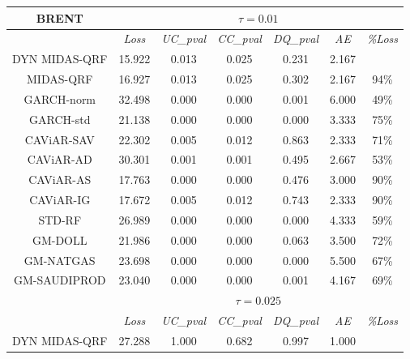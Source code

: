 \begin{table}[H]
\renewcommand{\arraystretch}{0.7}
\centering
\begin{tabular}{ccccccc}
\hline
\textbf{BRENT} & \multicolumn{6}{c}{$\tau=0.01$}                          \\ \hline
                                & \textit{Loss}   & \textit{UC\_pval} & \textit{CC\_pval} & \textit{DQ\_pval} & \textit{AE }   & \textit{\%Loss} \\ \hline
\rowcolor[HTML]{D9D9D9} 
DYN MIDAS-QRF                       & 15.922 & 0.013    & 0.025    & 0.231    & 2.167 &        \\
\rowcolor[HTML]{D9D9D9} 
MIDAS-QRF                   & 16.927 & 0.013    & 0.025    & 0.302    & 2.167 & 94\%   \\
GARCH-norm                      & 32.498 & 0.000    & 0.000    & 0.001    & 6.000 & 49\%   \\
GARCH-std                       & 21.138 & 0.000    & 0.000    & 0.000    & 3.333 & 75\%   \\
CAViAR-SAV                      & 22.302 & 0.005    & 0.012    & 0.863    & 2.333 & 71\%   \\
CAViAR-AD                       & 30.301 & 0.001    & 0.001    & 0.495    & 2.667 & 53\%   \\
CAViAR-AS                       & 17.763 & 0.000    & 0.000    & 0.476    & 3.000 & 90\%   \\
CAViAR-IG                       & 17.672 & 0.005    & 0.012    & 0.743    & 2.333 & 90\%   \\
STD-RF                          & 26.989 & 0.000    & 0.000    & 0.000    & 4.333 & 59\%   \\
GM-DOLL                         & 21.986 & 0.000    & 0.000    & 0.063    & 3.500 & 72\%   \\
GM-NATGAS                       & 23.698 & 0.000    & 0.000    & 0.000    & 5.500 & 67\%   \\
GM-SAUDIPROD                  & 23.040 & 0.000    & 0.000    & 0.001    & 4.167 & 69\%   \\ \hline
                                & \multicolumn{6}{c}{$\tau=0.025$}                         \\ \hline
                                & \textit{Loss}   & \textit{UC\_pval} & \textit{CC\_pval} & \textit{DQ\_pval} & \textit{AE }   & \textit{\%Loss} \\ \hline
\rowcolor[HTML]{D9D9D9} 
DYN MIDAS-QRF                        & 27.288 & 1.000    & 0.682    & 0.997    & 1.000 &        \\

\end{tabular}
\end{table}
